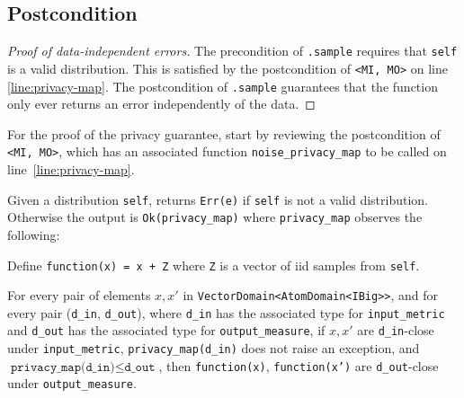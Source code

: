 \documentclass{article}
\begin{document}
\subsection*{Postcondition}
\begin{theorem}
\end{theorem}

\begin{proof}[Proof of data-independent errors]
    The precondition of \texttt{.sample} requires that \texttt{self} is a valid distribution.
    This is satisfied by the postcondition of \texttt{<MI, MO>} on line \ref{line:privacy-map}.
    The postcondition of \texttt{.sample} guarantees that the function only ever returns an error independently of the data.
\end{proof}

For the proof of the privacy guarantee, start by reviewing the postcondition of \texttt{<MI, MO>}, 
which has an associated function \texttt{noise\_privacy\_map} to be called on line~\ref{line:privacy-map}.
\begin{lemma}
    \label{lemma:new-privacy-map}
    Given a distribution \texttt{self},
    returns \texttt{Err(e)} if \texttt{self} is not a valid distribution.
    Otherwise the output is \texttt{Ok(privacy\_map)}
    where \texttt{privacy\_map} observes the following:

    Define \texttt{function(x) = x + Z} where \texttt{Z} is a vector of iid samples from \texttt{self}.

    For every pair of elements $x, x'$ in \texttt{VectorDomain<AtomDomain<IBig>{}>},
    and for every pair (\texttt{d\_in}, \texttt{d\_out}),
    where \texttt{d\_in} has the associated type for \texttt{input\_metric} and \texttt{d\_out} has the associated type for \texttt{output\_measure},
    if $x, x'$ are \texttt{d\_in}-close under \texttt{input\_metric}, \texttt{privacy\_map(d\_in)} does not raise an exception,
    and $\texttt{privacy\_map(d\_in)} \leq \texttt{d\_out}$,
    then \texttt{function(x)}, \texttt{function(x')} are \texttt{d\_out}-close under \texttt{output\_measure}.
\end{lemma}
\end{document}
